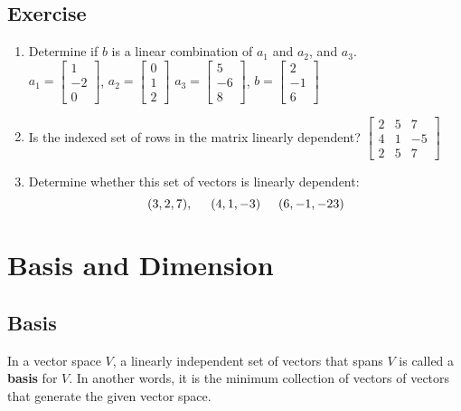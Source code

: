 \documentclass[aima104_lecturenotes_ku.tex]{subfiles}
\begin{document}
\subsection{Exercise}
\begin{enumerate}
\item Determine if $b$ is a linear combination of $a_1$ and $a_2$, and $a_3$. \\
  $a_1 = \begin{bmatrix}
    1 \\ -2 \\ 0
  \end{bmatrix}
  $, \hspace{10mm} $a_2 = \begin{bmatrix}
    0 \\ 1 \\ 2
  \end{bmatrix}
  $ \hspace{10mm} $ a_3=   \begin{bmatrix}
    5 \\ -6 \\ 8
  \end{bmatrix}
  $, \hspace{10mm} $b =  \begin{bmatrix}
    2 \\ -1 \\ 6
  \end{bmatrix}
  $

\item Is the indexed set of rows in the matrix linearly dependent? $\begin{bmatrix}
  2 & 5 & 7 \\
  4 & 1 & -5 \\
  2  & 5 & 7
\end{bmatrix}$

\item Determine whether this set of vectors is linearly dependent: $$(3,2,7), \hspace{5mm} (4,1,-3) \hspace{5mm} (6,-1,-23)$$
\end{enumerate}

\section{Basis and Dimension}
\subsection{Basis}
    In a vector space $V$, a linearly independent set of vectors that spans $V$ is called a \textbf{basis} for $V$. In another words, it is the minimum collection of vectors of vectors that generate the given vector space.
\end{document}
